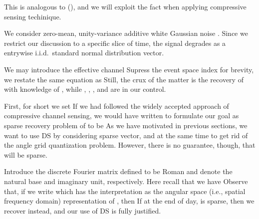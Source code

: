 This is analogous to (), and we will exploit the fact when applying compressive sensing techinique.

We consider zero-mean, unity-variance additive white Gaussian noise .
Since we restrict our discussion to a specific slice of time, the signal  degrades as a entrywise i.i.d.\ standard normal distribution vector.

We may introduce the effective channel
Supress the event space index for brevity, we restate the same equation as
Still, the crux of the matter is the recovery of  with knowledge of , while , , , and  are in our control.

\stopsection
\startsection [title={Proposed Method}]
\startsubsection [title={Vectorization}]

First, for short we set
If we had followed the widely accepted approach of compressive channel sensing, we would have written
to formulate our goal as sparse recovery problem of  to be
As we have motivated in previous sections, we want to use DS by considering sparse vector, and at the same time to get rid of the angle grid quantization problem.
However, there is no guarantee, though, that  will be sparse.

\stopsubsection

\startsubsection [title={Expression for the Angular Space}]

Introduce the discrete Fourier matrix  defined to be
Roman  and  denote the natural base and imaginary unit, respectively.
Here recall that we have
Observe that, if we write
which has the interpretation as the angular space (i.e., spatial frequency domain) representation of , then
If at the end of day,  is sparse, then we recover  instead, and our use of DS is fully justified.

